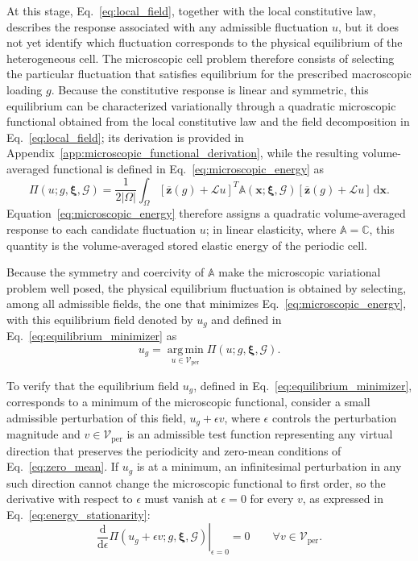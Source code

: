 \documentclass[pdflatex,sn-basic,Numbered]{sn-jnl}
\newcommand{\G}{\mathcal{G}}
\begin{document}
At this stage, Eq.~\eqref{eq:local_field}, together with the local constitutive
law, describes the response associated with any admissible fluctuation \(u\),
but it does not yet identify which fluctuation corresponds to the physical
equilibrium of the heterogeneous cell. The microscopic cell problem therefore
consists of selecting the particular fluctuation that satisfies equilibrium
for the prescribed macroscopic loading \(g\). Because the constitutive
response is linear and symmetric, this equilibrium can be characterized
variationally through a quadratic microscopic functional obtained from the
local constitutive law and the field decomposition in
Eq.~\eqref{eq:local_field}; its derivation is provided in
Appendix~\ref{app:microscopic_functional_derivation}, while the resulting
volume-averaged functional is defined in
Eq.~\eqref{eq:microscopic_energy} as
\begin{equation}
\label{eq:microscopic_energy}
\Pi(u;g,\boldsymbol{\xi},\G)
=
\frac{1}{2|\Omega|}
\int_{\Omega}
\left[
\overline{\boldsymbol z}(g)
+
\mathcal L u
\right]^T
\mathbb A(\boldsymbol x;\boldsymbol\xi,\G)
\left[
\overline{\boldsymbol z}(g)
+
\mathcal L u
\right]
\,\mathrm{d}\boldsymbol x.
\end{equation}
Equation~\eqref{eq:microscopic_energy} therefore assigns a quadratic
volume-averaged response to each candidate fluctuation \(u\); in linear
elasticity, where \(\mathbb A=\mathbb C\), this quantity is the
volume-averaged stored elastic energy of the periodic cell.

Because the symmetry and coercivity of \(\mathbb A\) make the microscopic
variational problem well posed, the physical equilibrium fluctuation is
obtained by selecting, among all admissible fields, the one that minimizes
Eq.~\eqref{eq:microscopic_energy}, with this equilibrium field denoted by
\(u_g\) and defined in Eq.~\eqref{eq:equilibrium_minimizer} as
\begin{equation}
\label{eq:equilibrium_minimizer}
u_g
=
\operatorname*{arg\,min}_{u\in\mathcal V_{\mathrm{per}}}
\Pi(u;g,\boldsymbol\xi,\G).
\end{equation}

To verify that the equilibrium field \(u_g\), defined in
Eq.~\eqref{eq:equilibrium_minimizer}, corresponds to a minimum of the
microscopic functional, consider a small admissible perturbation of this
field, \(u_g+\epsilon v\), where \(\epsilon\) controls the perturbation
magnitude and \(v\in\mathcal V_{\mathrm{per}}\) is an admissible test
function representing any virtual direction that preserves the periodicity
and zero-mean conditions of Eq.~\eqref{eq:zero_mean}. If \(u_g\) is at a
minimum, an infinitesimal perturbation in any such direction cannot change the
microscopic functional to first order, so the derivative with respect to
\(\epsilon\) must vanish at \(\epsilon=0\) for every \(v\), as expressed in
Eq.~\eqref{eq:energy_stationarity}:
\begin{equation}
\label{eq:energy_stationarity}
\left.
\frac{\mathrm{d}}{\mathrm{d}\epsilon}
\Pi(u_g+\epsilon v;g,\boldsymbol\xi,\G)
\right|_{\epsilon=0}
=
0
\qquad
\forall v\in\mathcal V_{\mathrm{per}}.
\end{equation}
\end{document}
